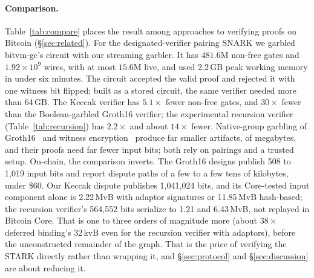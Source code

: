 \documentclass[11pt]{article}
\begin{document}
\paragraph{Comparison.} Table~\ref{tab:compare} places the result among
approaches to verifying proofs on Bitcoin (\S\ref{sec:related}). For the
designated-verifier pairing SNARK we garbled bitvm-gc's circuit with our
streaming garbler. It has $481.6$M non-free gates and $1.92\times10^9$ wires,
with at most $15.6$M live, and used 2.2\,GB peak working memory in under six
minutes. The circuit accepted the
valid proof and rejected it with one witness bit flipped; built as a stored
circuit, the same verifier needed more than 64\,GB. The Keccak verifier has
$5.1\times$ fewer non-free gates, and $30\times$ fewer than the Boolean-garbled
Groth16 verifier; the experimental recursion verifier
(Table~\ref{tab:recursion}) has $2.2\times$ and about $14\times$ fewer. Native-group garbling of
Groth16~\cite{kflt26native} and witness encryption~\cite{babe2026} produce far smaller
artifacts, of megabytes, and their proofs need far fewer input bits; both rely
on pairings and a trusted setup.
On-chain, the comparison inverts. The Groth16 designs publish 508 to 1{,}019
input bits and report dispute paths of a few to a few tens of kilobytes, under
\$60. Our Keccak dispute publishes 1{,}041{,}024 bits, and its Core-tested
input component alone is 2.22\,MvB with adaptor signatures or 11.85\,MvB
hash-based; the recursion verifier's 564{,}552 bits serialize to 1.21 and
6.43\,MvB, not replayed in Bitcoin Core. That is one to three orders of
magnitude more (about $38\times$ deferred binding's 32\,kvB even for the
recursion verifier with adaptors), before the unconstructed remainder of the
graph. That is the price of verifying the STARK directly rather than wrapping
it, and \S\ref{sec:protocol} and \S\ref{sec:discussion} are about reducing it.
\end{document}
